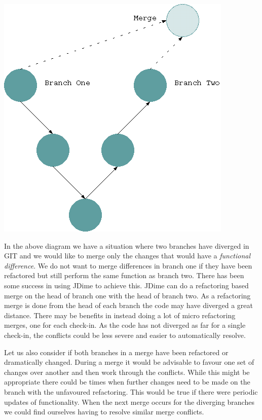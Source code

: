 \documentclass[12pt]{CRPITStyle}
\begin{document}
\begin{center}
\includegraphics[scale=0.5]{git-diag}
\end{center}

In the above diagram we have a situation where two branches have diverged in GIT and we would like to merge only the changes that would have a \emph{functional difference}. We do not want to merge differences in branch one if they have been refactored but still perform the same function as branch two. There has been some success in using JDime to achieve this. JDime can do a refactoring based merge on the head of branch one with the head of branch two. As a refactoring merge is done from the head of each branch the code may have diverged a great distance. There may be benefits in instead doing a lot of micro refactoring merges, one for each check-in. As the code has not diverged as far for a single check-in, the conflicts could be less severe and easier to automatically resolve. 

Let us also consider if both branches in a merge have been refactored or dramatically changed. During a merge it would be advisable to favour one set of changes over another and then work through the conflicts. While this might be appropriate there could be times when further changes need to be made on the branch with the unfavoured refactoring. This would be true if there were periodic updates of functionality. When the next merge occurs for the diverging branches we could find ourselves having to resolve similar merge conflicts. 
\end{document}
